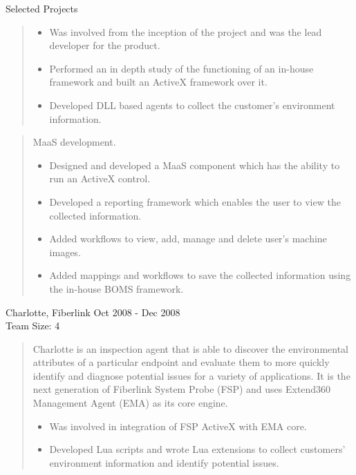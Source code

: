 \documentclass{resume}
\newcommand{\teamsize}{\\\sc\footnotesize Team Size: }
\begin{document}
\begin{category}{Selected Projects}{}
\begin{quote}
            \begin{itemize}
                \item Was involved from the inception of the project and was the
                    lead developer for the product.
                \item Performed an in depth study of the functioning of an
                    in-house framework and built an ActiveX framework over it.
                \item Developed DLL based agents to collect the customer's
                    environment information.
            \end{itemize}
        \end{quote}
        \begin{quote}
            MaaS development.
            \begin{itemize}
                \item Designed and developed a MaaS component which has the
                    ability to run an ActiveX control.
                \item Developed a reporting framework which enables the user to
                    view the collected information.
                \item Added workflows to view, add, manage and delete user's
                    machine images.
                \item Added mappings and workflows to save the collected
                    information using the in-house BOMS framework.
            \end{itemize}
        \end{quote}

    \pagebreak

    \item {\topic Charlotte,} Fiberlink
        {\period Oct 2008 - Dec 2008}
        {\teamsize 4}
        \begin{quote}
            Charlotte is an inspection agent that is able to discover the
            environmental attributes of a particular endpoint and evaluate them
            to more quickly identify and diagnose potential issues for a
            variety of applications. It is the next generation of Fiberlink
            System Probe (FSP) and uses Extend360 Management Agent (EMA) as its
            core engine.
            \begin{itemize}
                \item Was involved in integration of FSP ActiveX with EMA core.
                \item Developed Lua scripts and wrote Lua extensions to collect
                    customers' environment information and identify potential
                    issues.
            \end{itemize}
        \end{quote}


\end{category}
\end{document}
